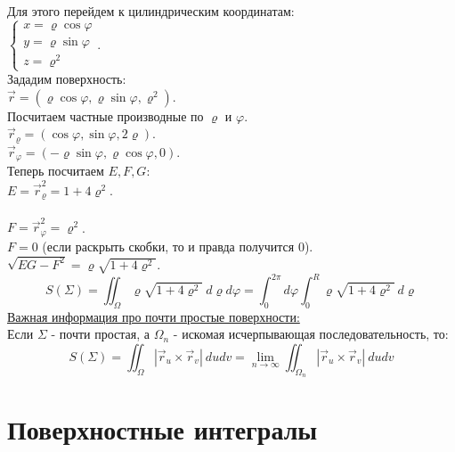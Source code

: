 \documentclass[12pt]{article}
\begin{document}
Для этого перейдем к цилиндрическим координатам:\\
$\begin{cases} x=\varrho \cos \varphi \\ y = \varrho \sin \varphi \\ z = \varrho^2 \end{cases}$.\\
Зададим поверхность:\\
$\overrightarrow{r} = (\varrho\cos\varphi, \varrho\sin\varphi, \varrho^2)$.\\
Посчитаем частные производные по $\varrho$ и $\varphi$.\\
$\overrightarrow{r}_\varrho = (\cos\varphi, \sin\varphi, 2\varrho)$.\\
$\overrightarrow{r}_\varphi = (-\varrho\sin\varphi, \varrho\cos\varphi, 0)$.\\
Теперь посчитаем $E, F, G$:\\
$E = \overrightarrow{r}_\varrho^2 = 1 + 4 \varrho^2$.\\\\
$F = \overrightarrow{r}_\varphi^2 = \varrho^2$.\\
$F = 0$ (если раскрыть скобки, то и правда получится 0).\\
$\sqrt{EG-F^2} = \varrho\sqrt{1+4\varrho^2}$.\\
$$S(\Sigma)=\iint_\Omega \varrho\sqrt{1+4\varrho^2} \ d\varrho d\varphi = \int_0^{2\pi} d\varphi \int_0^R \varrho\sqrt{1+4\varrho^2} \ d\varrho$$
\uline{Важная информация про почти простые поверхности:}\\
Если $\Sigma$ - почти простая, а $\Omega_n$ - искомая исчерпывающая последовательность, то:\\
$$S(\Sigma) = \iint_\Omega |\overrightarrow{r}_u \times \overrightarrow{r}_v| \ dudv = \lim_{n\to\infty} \iint_{\Omega_n} |\overrightarrow{r}_u \times \overrightarrow{r}_v| \ dudv$$
\section{Поверхностные интегралы}
\end{document}
